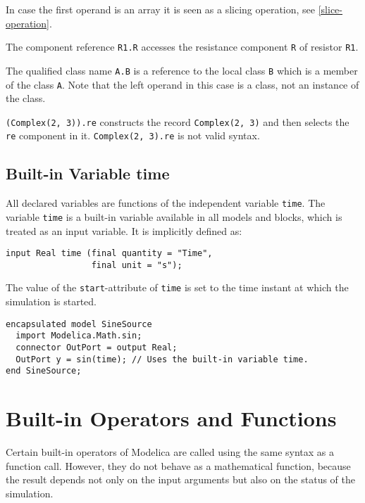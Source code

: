 In case the first operand is an array it is seen as a slicing operation, see \cref{slice-operation}.

\begin{example}
The component reference \lstinline!R1.R! accesses the resistance component \lstinline!R! of resistor \lstinline!R1!.

The qualified class name \lstinline!A.B! is a reference to the local class \lstinline!B! which is a member of the class \lstinline!A!.
Note that the left operand in this case is a class, not an instance of the class.

\lstinline!(Complex(2, 3)).re! constructs the record \lstinline!Complex(2, 3)! and then selects the \lstinline!re! component in it.
\lstinline!Complex(2, 3).re! is not valid syntax.
\end{example}

\subsection{Built-in Variable time}\label{built-in-variable-time}

All declared variables are functions of the independent variable \lstinline!time!.
The variable \lstinline!time! is a built-in variable available in all models and blocks, which is treated as an input variable.
It is implicitly defined as:
\begin{lstlisting}[language=modelica]
input Real time (final quantity = "Time",
                 final unit = "s");
\end{lstlisting}

The value of the \lstinline!start!-attribute of \lstinline!time! is set to the time instant at which the simulation is started.

\begin{example}
\begin{lstlisting}[language=modelica]
encapsulated model SineSource
  import Modelica.Math.sin;
  connector OutPort = output Real;
  OutPort y = sin(time); // Uses the built-in variable time.
end SineSource;
\end{lstlisting}
\end{example}

\section{Built-in Operators and Functions}\label{built-in-intrinsic-operators-with-function-syntax}

Certain built-in operators of Modelica are called using the same syntax as a function call.
However, they do not behave as a mathematical function, because the result depends not only on the input arguments but also on the status of the simulation.

